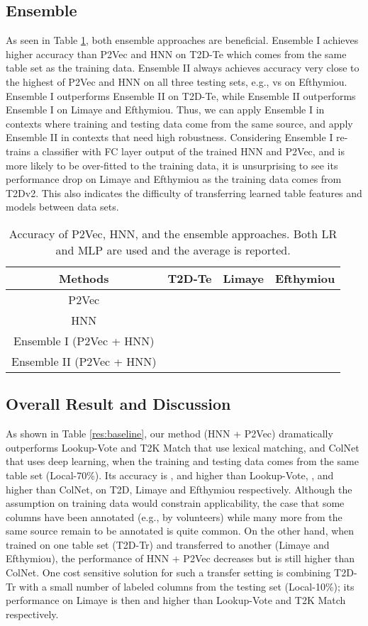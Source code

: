 \documentclass{article}
\begin{document}
\subsection{Ensemble}
As seen in Table \ref{res:ensemble}, both ensemble approaches are beneficial.
Ensemble I achieves higher accuracy than P2Vec and HNN on T2D-Te which comes from the same table set as the training data.
Ensemble II always achieves accuracy very close to the highest of P2Vec and HNN on all three testing sets, e.g.,  vs  on Efthymiou. 
Ensemble I outperforms Ensemble II on T2D-Te, 
while Ensemble II outperforms Ensemble I on Limaye and Efthymiou.
Thus, we can apply Ensemble I in contexts where training and testing data come from the same source, 
and apply Ensemble II in contexts that need high robustness.
Considering Ensemble I re-trains a classifier with FC layer output of the trained HNN and P2Vec, and is more likely to be over-fitted to the training data, 
it is unsurprising to see its performance drop on Limaye and Efthymiou as the training data comes from T2Dv2.
This also indicates the difficulty of transferring learned table features and models between data sets.


\begin{table}[h!]
\scriptsize{
\centering
\begin{tabular}[t]{c|c|c|c}
\hline
Methods & T2D-Te & Limaye & Efthymiou    \\\hline 
 P2Vec & & &  \\
 HNN   & & &  \\\hline
 Ensemble I (P2Vec + HNN)  & & &  \\
 Ensemble II (P2Vec + HNN) & & &  \\\hline
\end{tabular}
\vspace{-0.2cm}
\caption{\footnotesize
Accuracy of P2Vec, HNN, and the ensemble approaches.
Both LR and MLP are used and the average is reported.
}\label{res:ensemble}
}
\end{table}
    
\subsection{Overall Result and Discussion}
As shown in Table \ref{res:baseline}, 
our method (HNN + P2Vec) dramatically outperforms Lookup-Vote and T2K Match that use lexical matching, and ColNet that uses deep learning,
when the training and testing data comes from the same table set (Local-70\%).
Its accuracy is ,  and  higher than Lookup-Vote,
,  and  higher than ColNet,
on T2D, Limaye and Efthymiou respectively.
Although the assumption on training data would constrain applicability, 
the case that some columns have been annotated (e.g., by volunteers) while many more from the same source remain to be annotated is quite common.
On the other hand, when  trained on one table set (T2D-Tr) and transferred to another (Limaye and Efthymiou), the performance of HNN + P2Vec decreases but is still higher than ColNet. 
One cost sensitive solution for such a transfer setting is combining T2D-Tr with a small number of labeled columns from the testing set (Local-10\%);
its performance on Limaye is then  and  higher than Lookup-Vote and T2K Match respectively.
\end{document}
